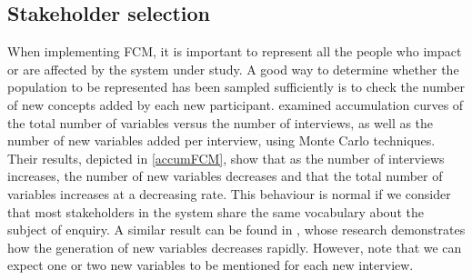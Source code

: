 \subsection{Stakeholder selection}

When implementing FCM, it is important to represent all the people who impact or are affected by the system under study. A good way to determine whether the population to be represented has been sampled sufficiently is to check the number of new concepts added by each new participant. \cite{ozesmi2004ecological} examined accumulation curves of the total number of variables versus the number of interviews, as well as the number of new variables added per interview, using Monte Carlo techniques. Their results, depicted in \cref{accumFCM}, show that as the number of interviews increases, the number of new variables decreases and that the total number of variables increases at a decreasing rate. This behaviour is normal if we consider that most stakeholders in the system share the same vocabulary about the subject of enquiry. A similar result can be found in \cite{morone2021using}, whose research demonstrates how the generation of new variables decreases rapidly. However, \cite{ozesmi2004ecological} note that we can expect one or two new variables to be mentioned for each new interview. 

